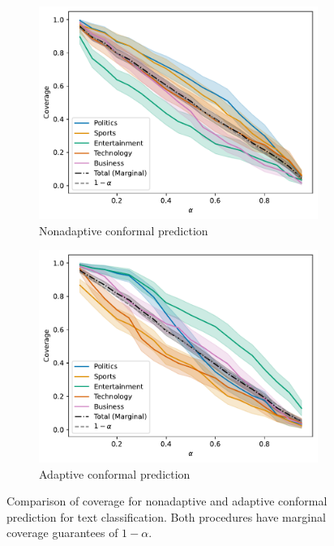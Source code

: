 \documentclass[a4paper, 12pt]{article}
\begin{document}
\begin{figure}[ht]
    \centering
    \begin{subfigure}[b]{0.8\linewidth}
        \includegraphics[width=\linewidth]{figures/nonadaptive_conditional_coverage.pdf}
        \caption{Nonadaptive conformal prediction}
        \label{fig:nonadaptive_coverage}
    \end{subfigure}
    \begin{subfigure}[b]{0.8\linewidth}
        \includegraphics[width=\linewidth]{figures/adaptive_conditional_coverage.pdf}
        \caption{Adaptive conformal prediction}
        \label{fig:adaptive_coverage}
    \end{subfigure}
    \caption{Comparison of coverage for nonadaptive and adaptive conformal prediction for text classification. Both procedures have marginal coverage guarantees of $1-\alpha$. }
    \label{fig:coverage}
\end{figure}
\end{document}
